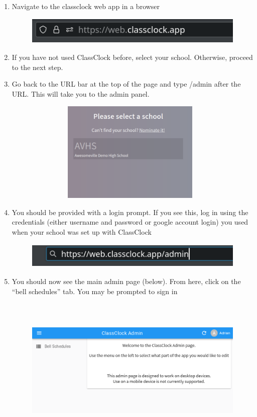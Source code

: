 \documentclass{article}
\begin{document}
\begin{enumerate}
\item {
Navigate to the classclock web app in a browser}
\begin{figure}
\includegraphics[width=4.4055in,height=0.5102in]{Mini20Manual-img007.png}\end{figure}
\item {
If you have not used ClassClock before, select your school. Otherwise, proceed to the next step.}
\item {
Go back to the URL bar at the top of the page and type /admin after the URL. This will take you to the admin panel.}
\begin{figure}
\includegraphics[width=4.0744in,height=1.9016in]{Mini20Manual-img008.png}\end{figure}
\item {
You should be provided with a login prompt. If you see this, log in using the credentials (either username and password
or google account login) you used when your school was set up with ClassClock}
\begin{figure}
\includegraphics[width=4.6866in,height=0.4783in]{Mini20Manual-img009.png}\end{figure}
\item {
You should now see the main admin page (below). From here, click on the “bell schedules” tab. You may be prompted to
sign in}
\begin{figure}
\includegraphics[width=6.5in,height=2.7626in]{Mini20Manual-img004.png}\end{figure}
\end{enumerate}
\end{document}
